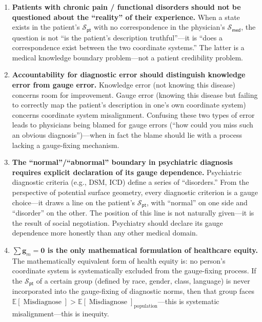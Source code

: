 \documentclass[12pt,a4paper]{article}
\theoremstyle{remark}
\newcommand{\med}{\textsf{med}}
\newcommand{\pt}{\textsf{pt}}
\DeclareMathOperator{\Misdiagnose}{Misdiagnose}
\begin{document}
\begin{enumerate}[label=\textbf{(\arabic*)}]
    \item \textbf{Patients with chronic pain / functional disorders should not be questioned about the ``reality'' of their experience.} When a state exists in the patient's $\mathcal{S}_{\pt}$ with no correspondence in the physician's $\mathcal{S}_{\med}$, the question is not ``is the patient's description truthful''---it is ``does a correspondence exist between the two coordinate systems.'' The latter is a medical knowledge boundary problem---not a patient credibility problem.

    \item \textbf{Accountability for diagnostic error should distinguish knowledge error from gauge error.} Knowledge error (not knowing this disease) concerns room for improvement. Gauge error (knowing this disease but failing to correctly map the patient's description in one's own coordinate system) concerns coordinate system misalignment. Confusing these two types of error leads to physicians being blamed for gauge errors (``how could you miss such an obvious diagnosis'')---when in fact the blame should lie with a process lacking a gauge-fixing mechanism.

    \item \textbf{The ``normal''/``abnormal'' boundary in psychiatric diagnosis requires explicit declaration of its gauge dependence.} Psychiatric diagnostic criteria (e.g., DSM, ICD) define a series of ``disorders.'' From the perspective of potential surface geometry, every diagnostic criterion is a gauge choice---it draws a line on the patient's $\mathcal{S}_{\pt}$, with ``normal'' on one side and ``disorder'' on the other. The position of this line is not naturally given---it is the result of social negotiation. Psychiatry should declare its gauge dependence more honestly than any other medical domain.

    \item \textbf{$\sum \mathbf{g}_m = \mathbf{0}$ is the only mathematical formulation of healthcare equity.} The mathematically equivalent form of health equity is: no person's coordinate system is systematically excluded from the gauge-fixing process. If the $\mathcal{S}_{\pt}$ of a certain group (defined by race, gender, class, language) is never incorporated into the gauge-fixing of diagnostic norms, then that group faces $\mathbb{E}[\Misdiagnose] > \mathbb{E}[\Misdiagnose]_{\text{population}}$---this is systematic misalignment---this is inequity.
\end{enumerate}
\end{document}
